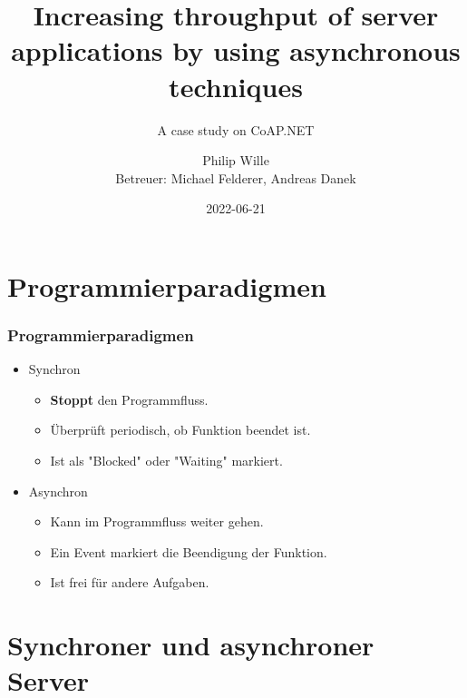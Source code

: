 \documentclass[11pt,t,usepdftitle=false,aspectratio=169,usenames,dvipsnames]{beamer}
\title[Finale Präsentation CoAP.NET]{Increasing throughput of server applications by using asynchronous techniques}
\subtitle{A case study on CoAP.NET}
\author{Philip Wille\\Betreuer: Michael Felderer, Andreas Danek}
\date{2022-06-21}
\begin{document}
    \maketitle

    \section{Programmierparadigmen}
    \label{sec:programmierparadigmen}
    \begin{frame}
        \frametitle{Programmierparadigmen}
        \begin{itemize}
            \item<1-> Synchron
            \begin{itemize}
                \item<3-> \textcolor{uibkblue}{\textbf{Stoppt}} den Programmfluss.
                \item<5-> Überprüft periodisch, ob Funktion beendet ist.
                \item<7-> Ist als "Blocked" oder "Waiting" markiert.
            \end{itemize}
            \item<2-> Asynchron
            \begin{itemize}
                \item<4-> Kann im Programmfluss weiter gehen.
                \item<6-> Ein Event markiert die Beendigung der Funktion.
                \item<8-> Ist frei für andere Aufgaben.
            \end{itemize}
        \end{itemize}
    \end{frame}

    \section{Synchroner und asynchroner Server}
    \label{sec:synchroner-und-asynchroner-server}
\end{document}
